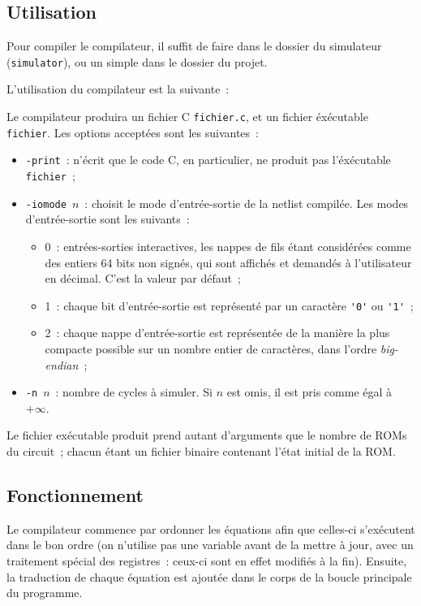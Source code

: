 \documentclass[11pt,a4paper]{article}
\newcommand{\acronym}[1]{\MakeUppercase{#1}}
\newcommand{\relire}{}
\newcommand{\relu}[1]{}
\begin{document}
\relire
\relu{Nathanaël}
\relu{No}
\relu{Théo}

\subsection{Utilisation}

Pour compiler le compilateur, il suffit de faire
 dans le dossier du simulateur
(\verb!simulator!), ou un simple  dans le dossier du
projet.

L'utilisation du compilateur est la suivante~:


Le compilateur produira un fichier C \verb!fichier.c!, et un fichier
éxécutable \verb!fichier!. Les options acceptées sont les suivantes~:
\begin{itemize}
\item{\verb!-print!~: n'écrit que le code C, en particulier, ne
    produit pas l'éxécutable \verb!fichier!~;}
\item{\verb!-iomode!~$n$~: choisit le mode d'entrée-sortie de la
    netlist compilée. Les modes d'entrée-sortie sont les suivants~:
    \begin{itemize}
    \item{0~: entrées-sorties interactives, les nappes de fils étant
        considérées comme des entiers 64 bits non signés, qui sont
        affichés et demandés à l'utilisateur en décimal. C'est la
        valeur par défaut~;}
    \item{1~: chaque bit d'entrée-sortie est représenté par un
        caractère \verb!'0'! ou \verb!'1'!~;}
    \item{2~: chaque nappe d'entrée-sortie est représentée de la
        manière la plus compacte possible sur un nombre entier de
        caractères, dans l'ordre \textit{big-endian}~;}
    \end{itemize}
}
\item{\verb!-n!~$n$~: nombre de cycles à simuler. Si $n$ est omis, il
    est pris comme égal à $+\infty$.}
\end{itemize}

Le fichier exécutable produit prend autant d'arguments que le nombre
de \acronym{rom}s du circuit~; chacun étant un fichier binaire
contenant l'état initial de la \acronym{rom}.

\subsection{Fonctionnement}
Le compilateur commence par ordonner les équations afin que celles-ci
s'exécutent dans le bon ordre (on n'utilise pas une variable avant de
la mettre à jour, avec un traitement spécial des registres~: ceux-ci
sont en effet modifiés à la fin). Ensuite, la traduction de chaque
équation est ajoutée dans le corps de la boucle principale du
programme.
\end{document}
